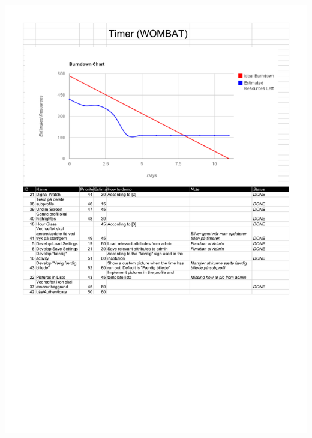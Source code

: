 \begin{center}
		\includegraphics[width=\textwidth]{Development/burndown_charts/Sprint_4.pdf}

\end{center}
